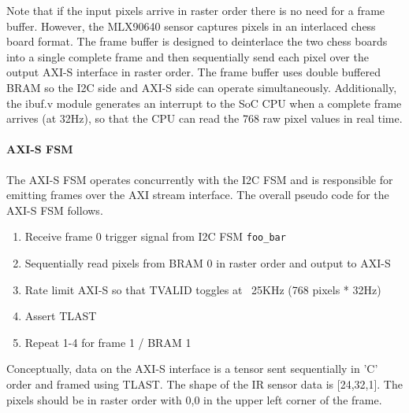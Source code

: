 Note that if the input pixels arrive in raster order there is no need for a
frame buffer. However, the MLX90640 sensor captures pixels in an interlaced
chess board format. The frame buffer is designed to deinterlace the two chess
boards into a single complete frame and then sequentially send each pixel over
the output AXI-S interface in raster order. The frame buffer uses double
buffered BRAM so the I2C side and AXI-S side can operate simultaneously.
Additionally, the ibuf.v module generates an interrupt to the SoC CPU when a
complete frame arrives (at 32Hz), so that the CPU can read the 768 raw pixel
values in real time.

\paragraph{AXI-S FSM}
The AXI-S FSM operates concurrently with the I2C FSM and is responsible for
emitting frames over the AXI stream interface. The overall pseudo code for the
AXI-S FSM follows.
\begin{enumerate}[noitemsep] %
	\item	Receive frame 0 trigger signal from I2C FSM \verb|foo_bar|
\item	Sequentially read pixels from BRAM 0 in raster order and output to AXI-S
\item	Rate limit AXI-S so that TVALID toggles at ~25KHz (768 pixels * 32Hz)
\item	Assert TLAST
\item	Repeat 1-4 for frame 1 / BRAM 1
\end{enumerate}
Conceptually, data on the AXI-S interface is a tensor sent sequentially in 'C'
order and framed using TLAST. The shape of the IR sensor data is [24,32,1]. The
pixels should be in raster order with 0,0 in the upper left corner of the
frame.

